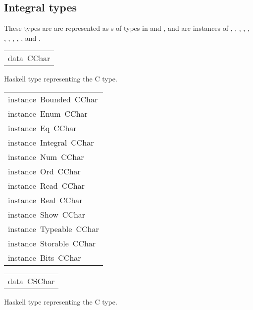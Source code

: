 \subsection{Integral types
}
These types are are represented as s of
 types in  and , and are instances of
 , , , ,
 , , , ,
 , ,  and
 .
\par

\begin{haddockdesc}
\item[\begin{tabular}{@{}l}
data\ CChar
\end{tabular}]\haddockbegindoc
Haskell type representing the C  type.
\par

\end{haddockdesc}
\begin{haddockdesc}
\item[\begin{tabular}{@{}l}
instance\ Bounded\ CChar\\instance\ Enum\ CChar\\instance\ Eq\ CChar\\instance\ Integral\ CChar\\instance\ Num\ CChar\\instance\ Ord\ CChar\\instance\ Read\ CChar\\instance\ Real\ CChar\\instance\ Show\ CChar\\instance\ Typeable\ CChar\\instance\ Storable\ CChar\\instance\ Bits\ CChar
\end{tabular}]
\end{haddockdesc}
\begin{haddockdesc}
\item[\begin{tabular}{@{}l}
data\ CSChar
\end{tabular}]\haddockbegindoc
Haskell type representing the C  type.
\par

\end{haddockdesc}
